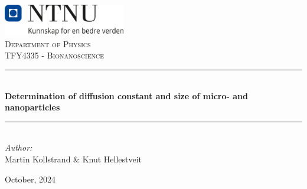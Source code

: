 \begin{titlepage}
\onecolumn
\vbox{ }
\vbox{ }
\begin{center}

\includegraphics[width=0.40\textwidth]{Images/NTNU_logo.png}\\[1cm]
\textsc{\LARGE Department of Physics}\\[1.5cm]
\textsc{\Large TFY4335 - Bionanoscience}\\[0.5cm]
\vbox{ }

\rule{\linewidth}{0.5mm} \\[0.4cm]
{ \huge \bfseries Determination of diffusion constant and size of micro- and nanoparticles}\\[0.4cm]
\rule{\linewidth}{0.5mm} \\[1.5cm]

\large
\emph{Author:}\\
Martin Kollstrand \& Knut Hellestveit
\vfill

{\large October, 2024}

\end{center}
\end{titlepage}
